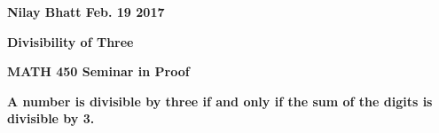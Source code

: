 \documentclass[12pt, fullpage]{article}
\begin{document}
\begin{flushleft}
\textbf{Nilay Bhatt Feb. 19 2017}		
\end{flushleft}

\begin{center}
	\textbf{Divisibility of Three}
\end{center}

\begin{center}
		
{\bf MATH 450 Seminar in Proof}
 \\
\end{center}

\begin{center}
\textbf{A number is divisible by three if and only if the sum of the digits is divisible by 3.}
\end{center}
\end{document}
